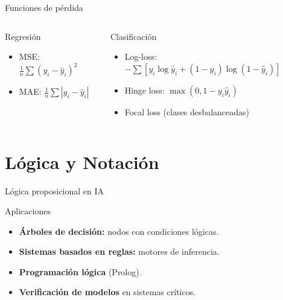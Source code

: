 \documentclass[aspectratio=169, 10pt, xcolor=table]{beamer}
\begin{document}
\begin{frame}{Funciones de pérdida}
    \begin{columns}[t]
        \begin{alertblock}{Regresión}
            \begin{itemize}
                \item MSE: $\frac{1}{n}\sum (y_i-\hat{y}_i)^2$
                \item MAE: $\frac{1}{n}\sum |y_i-\hat{y}_i|$
            \end{itemize}
        \end{alertblock}
        \begin{alertblock}{Clasificación}
            \begin{itemize}
                \item Log-loss: $-\sum [y_i\log\hat{y}_i+(1-y_i)\log(1-\hat{y}_i)]$
                \item Hinge loss: $\max(0,1-y_i\hat{y}_i)$
                \item Focal loss (clases desbalanceadas)
            \end{itemize}
        \end{alertblock}
    \end{columns}
\end{frame}

\section{Lógica y Notación}

\begin{frame}{Lógica proposicional en IA}
    \begin{block}{Aplicaciones}
        \begin{itemize}
            \item \textbf{Árboles de decisión:} nodos con condiciones lógicas.
            \item \textbf{Sistemas basados en reglas:} motores de inferencia.
            \item \textbf{Programación lógica} (Prolog).
            \item \textbf{Verificación de modelos} en sistemas críticos.
        \end{itemize}
    \end{block}
\end{frame}
\end{document}
